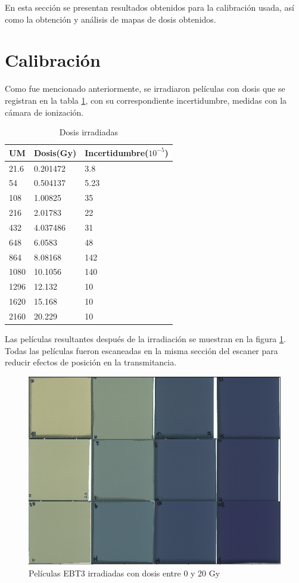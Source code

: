 En esta sección se presentan resultados obtenidos para la calibración usada, así como la obtención y análisis de mapas de dosis obtenidos.
\section{Calibración}
Como fue mencionado anteriormente, se irradiaron películas con dosis que se registran en la tabla \ref{tab:DosisIrra}, con su correspondiente incertidumbre, medidas con la cámara de ionización.

\begin{table}[]
	\centering
	\begin{tabular}{|l|l|l|}
		\hline
		UM& Dosis(Gy)    & Incertidumbre($10^{-5}$) \\ \hline
		21.6&0.201472 & 3.8\\ \hline
		54&0.504137 & 5.23 \\ \hline
		108&1.00825  & 35\\ \hline
		216&2.01783  & 22\\ \hline
		432&4.037486 & 31 \\ \hline
		648&6.0583   & 48\\ \hline
		864&8.08168  & 142\\ \hline
		1080&10.1056  & 140\\ \hline
		1296&12.132   & 10\\ \hline
		1620&15.168   & 10\\ \hline
		2160&20.229   & 10\\ \hline
	\end{tabular}
	\caption{Dosis irradiadas}
	\label{tab:DosisIrra}
\end{table}

Las películas resultantes después de la irradiación se muestran en la figura \ref{fig:peliculasIrradiacion}. Todas las películas fueron escaneadas en la misma sección del escaner para reducir efectos de posición en la transmitancia.\\
\begin{figure}[H]
	\centering
	\includegraphics[width=0.7\linewidth]{images/peliculasIrradiadas.png}
	\caption{Películas EBT3 irradiadas con dosis entre 0 y 20 Gy }
	\label{fig:peliculasIrradiacion}
\end{figure}

